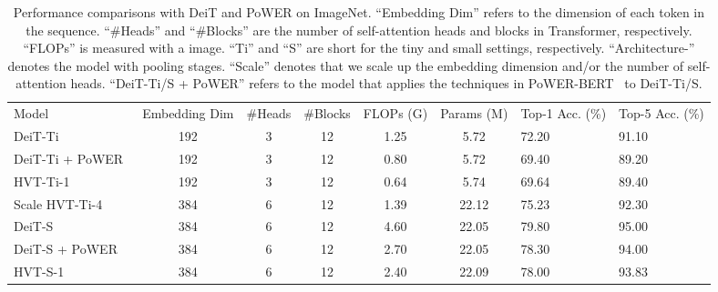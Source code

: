 \begin{table*}[]
\renewcommand\arraystretch{1.3}
\centering
\caption{
Performance comparisons with DeiT and PoWER on ImageNet. ``Embedding Dim'' refers to the dimension of each token in the sequence. ``\#Heads'' and ``\#Blocks'' are the number of self-attention heads and blocks in Transformer, respectively. ``FLOPs'' is measured with a  image. 
``Ti'' and ``S'' are short for the tiny and small settings, respectively. “Architecture-” denotes the model with  pooling stages. ``Scale'' denotes that we scale up the embedding dimension and/or the number of self-attention heads. ``DeiT-Ti/S + PoWER'' refers to the model that applies the techniques in PoWER-BERT~\cite{powerbert} to DeiT-Ti/S.
}
\resizebox{0.9\textwidth}{!} {
\fontsize{11}{11}\selectfont
\begin{tabular}{@{}lccccc|ll@{}}
Model & Embedding Dim & \#Heads & \#Blocks & FLOPs (G) & Params (M) & Top-1 Acc. (\%) & Top-5 Acc. (\%) \\ 
\shline
DeiT-Ti~\cite{deit} & 192 & 3 & 12 & 1.25 & 5.72 & 72.20 & 91.10 \\
DeiT-Ti + PoWER~\cite{powerbert}  & 192 & 3 & 12 & 0.80 & 5.72 & 69.40 {\color[HTML]{CB0000} \fontsize{9pt}{9pt}\selectfont{(-2.80)}} & 89.20 {\color[HTML]{CB0000}\fontsize{9pt}{9pt}\selectfont{(-1.90)}} \\
HVT-Ti-1 & 192 & 3 & 12 & 0.64 & 5.74 & 69.64 {\color[HTML]{CB0000}\fontsize{9pt}{9pt}\selectfont{(-2.56)}} & 89.40 {\color[HTML]{CB0000}\fontsize{9pt}{9pt}\selectfont{(-1.70)}} \\ 
Scale HVT-Ti-4 & 384 & 6 & 12 & 1.39 & 22.12 & 75.23 {\color[HTML]{009901} \fontsize{9pt}{9pt}\selectfont{(+3.03)}} & 92.30 {\color[HTML]{009901}  \fontsize{9pt}{9pt}\selectfont{(+1.20)}} \\ \hline
DeiT-S~\cite{deit} & 384 & 6 & 12 & 4.60 & 22.05 & 79.80 & 95.00 \\
DeiT-S + PoWER~\cite{powerbert}  & 384 & 6 & 12 & 2.70 & 22.05 & 78.30  {\color[HTML]{CB0000}\fontsize{9pt}{9pt}\selectfont{(-1.50)}}  & 94.00  {\color[HTML]{CB0000}\fontsize{9pt}{9pt}\selectfont{(-1.00)}} \\
HVT-S-1 & 384 & 6 & 12 & 2.40 & 22.09 & 78.00 {\color[HTML]{CB0000}\fontsize{9pt}{9pt}\selectfont{(-1.80)}} & 93.83  {\color[HTML]{CB0000}\fontsize{9pt}{9pt}\selectfont{(-1.17)}}
\end{tabular}
}
\label{tab:compare_imagenet}
\vspace{-5pt}
\end{table*}

